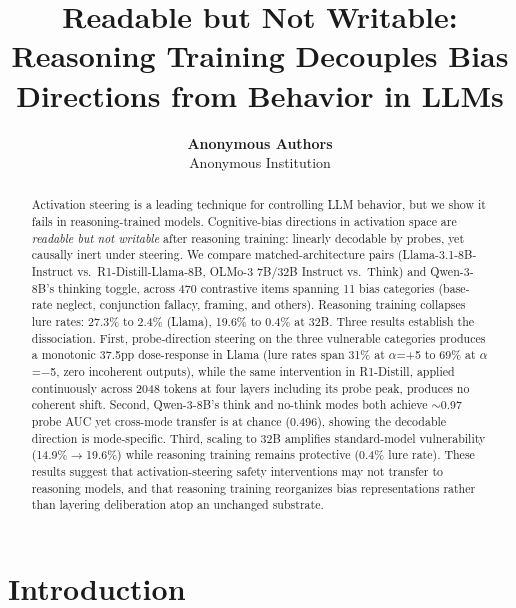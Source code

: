 \documentclass{article}
\title{Readable but Not Writable: Reasoning Training Decouples Bias Directions from Behavior in LLMs}
\author{%
  \textbf{Anonymous Authors}\\
  Anonymous Institution\\
}
\date{}
\begin{document}
\maketitle


\begin{abstract}
Activation steering is a leading technique for controlling LLM behavior,
but we show it fails in reasoning-trained models.  Cognitive-bias
directions in activation space are \emph{readable but not writable}
after reasoning training: linearly decodable by probes, yet causally
inert under steering.
We compare matched-architecture pairs (Llama-3.1-8B-Instruct vs.\
R1-Distill-Llama-8B, OLMo-3 7B/32B Instruct vs.\ Think) and
Qwen-3-8B's thinking toggle, across 470 contrastive items spanning 11
bias categories (base-rate neglect, conjunction fallacy, framing, and
others).  Reasoning training collapses lure rates: 27.3\% to 2.4\%
(Llama), 19.6\% to 0.4\% at 32B.
Three results establish the dissociation.  First, probe-direction
steering on the three vulnerable categories produces a monotonic 37.5pp
dose-response in Llama (lure rates span 31\% at $\alpha$=+5 to 69\%
at $\alpha$=$-$5, zero incoherent outputs), while the same intervention
in R1-Distill, applied continuously across 2048 tokens at four layers
including its probe peak, produces no coherent shift.  Second,
Qwen-3-8B's think and no-think modes both achieve ${\sim}$0.97 probe
AUC yet cross-mode transfer is at chance (0.496), showing the decodable
direction is mode-specific.  Third, scaling to 32B amplifies
standard-model vulnerability (14.9\%$\to$19.6\%) while reasoning
training remains protective (0.4\% lure rate).
These results suggest that activation-steering safety interventions may
not transfer to reasoning models, and that reasoning training
reorganizes bias representations rather than layering deliberation atop
an unchanged substrate.
\end{abstract}


\section{Introduction}
\label{sec:intro}
\end{document}
